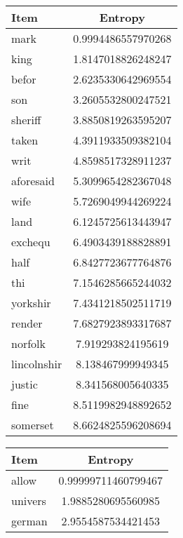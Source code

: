 \documentclass[paper=a4, fontsize=11pt]{scrartcl}
\begin{document}
\begin{table}
    \begin{minipage}{.5\textwidth}
        \small
        \centering
    	\begin{tabular}{l S[round-precision=4]}
    		\toprule
    		{Item} & {Entropy}\\
    		\midrule
    		mark & 0.9994486557970268\\
    		king & 1.8147018826248247\\
    		befor & 2.6235330642969554\\
    		son & 3.2605532800247521\\
    		sheriff & 3.8850819263595207\\
    		taken & 4.3911933509382104\\
    		writ & 4.8598517328911237\\
    		aforesaid & 5.3099654282367048\\
    		wife & 5.7269049944269224\\
    		land & 6.1245725613443947\\
    		exchequ & 6.4903439188828891\\
    		half & 6.8427723677764876\\
    		thi & 7.1546285665244032\\
    		yorkshir & 7.4341218502511719\\
    		render & 7.6827923893317687\\
    		norfolk & 7.919293824195619\\
    		lincolnshir & 8.138467999949345\\
    		justic & 8.341568005640335\\
    		fine & 8.5119982948892652\\
    		somerset & 8.6624825596208694\\
    		\bottomrule
    	\end{tabular}
    	\label{t:miki_finerolls}
    \end{minipage}
    \begin{minipage}{.5\textwidth}
        \small
        \centering
    	\begin{tabular}{l S[round-precision=4]}
    		\toprule
    		{Item} & {Entropy}\\
    		\midrule
    		allow & 0.99999711460799467\\
    		univers & 1.9885280695560985\\
    		german & 2.9554587534421453\\

\end{tabular}
\end{minipage}
\end{table}
\end{document}
